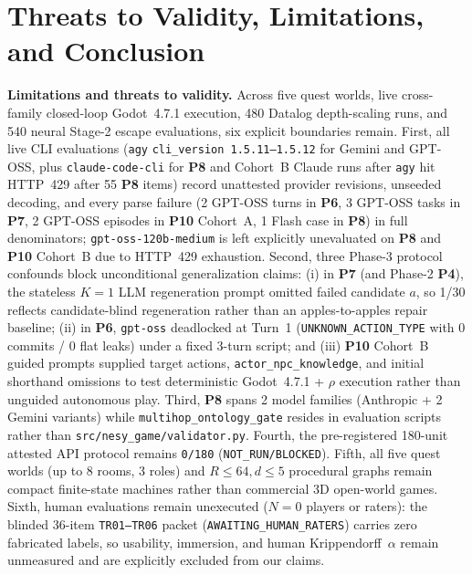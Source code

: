 \FloatBarrier
\section{Threats to Validity, Limitations, and Conclusion}\label{sec:conclusion}
\textbf{Limitations and threats to validity.} Across five quest worlds, live cross-family closed-loop Godot~4.7.1 execution, 480 Datalog depth-scaling runs, and 540 neural Stage-2 escape evaluations, six explicit boundaries remain. First, all live CLI evaluations (\texttt{agy} \texttt{cli\_version~1.5.11--1.5.12} for Gemini and GPT-OSS, plus \texttt{claude-code-cli} for \textbf{P8} and Cohort~B Claude runs after \texttt{agy} hit HTTP~429 after 55 \textbf{P8} items) record unattested provider revisions, unseeded decoding, and every parse failure (2 GPT-OSS turns in \textbf{P6}, 3 GPT-OSS tasks in \textbf{P7}, 2 GPT-OSS episodes in \textbf{P10} Cohort~A, 1 Flash case in \textbf{P8}) in full denominators; \texttt{gpt-\allowbreak oss-\allowbreak 120b-\allowbreak medium} is left explicitly unevaluated on \textbf{P8} and \textbf{P10} Cohort~B due to HTTP~429 exhaustion. Second, three Phase-3 protocol confounds block unconditional generalization claims: (i) in \textbf{P7} (and Phase-2 \textbf{P4}), the stateless $K{=}1$ LLM regeneration prompt omitted failed candidate $a$, so 1/30 reflects candidate-blind regeneration rather than an apples-to-apples repair baseline; (ii) in \textbf{P6}, \texttt{gpt-oss} deadlocked at Turn~1 (\texttt{UNKNOWN\_ACTION\_TYPE} with 0 commits / 0 flat leaks) under a fixed 3-turn script; and (iii) \textbf{P10} Cohort~B guided prompts supplied target actions, \texttt{actor\_npc\_knowledge}, and initial shorthand omissions to test deterministic Godot~4.7.1 + $\rho$ execution rather than unguided autonomous play. Third, \textbf{P8} spans 2 model families (Anthropic + 2 Gemini variants) while \texttt{multihop\_ontology\_gate} resides in evaluation scripts rather than \texttt{src/nesy\_game/validator.py}. Fourth, the pre-registered 180-unit attested API protocol remains \texttt{0/180} (\texttt{NOT\_RUN/BLOCKED}). Fifth, all five quest worlds (up to 8 rooms, 3 roles) and $R{\le}64, d{\le}5$ procedural graphs remain compact finite-state machines rather than commercial 3D open-world games. Sixth, human evaluations remain unexecuted ($N{=}0$ players or raters): the blinded 36-item \texttt{TR01--TR06} packet (\texttt{AWAITING\_}\allowbreak\texttt{HUMAN\_}\allowbreak\texttt{RATERS}) carries zero fabricated labels, so usability, immersion, and human Krippendorff~$\alpha$ remain unmeasured and are explicitly excluded from our claims.

